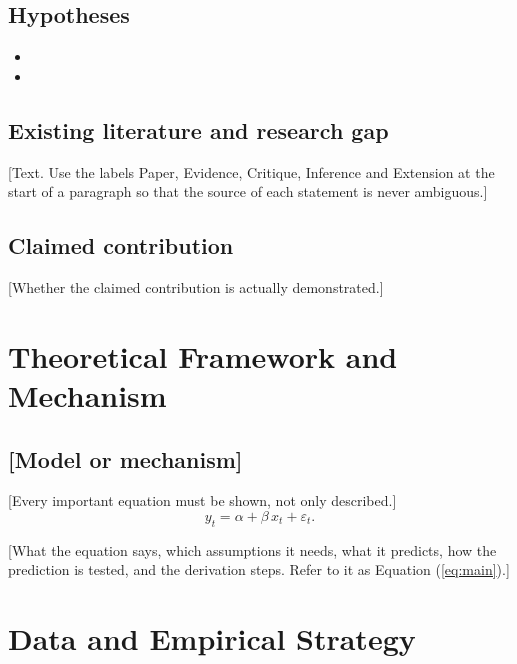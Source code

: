 \documentclass{lrreview}
\begin{document}
\subsection{Hypotheses}
\begin{itemize}
  \item{}
  \item{}
\end{itemize}

\subsection{Existing literature and research gap}
[Text. Use the labels Paper, Evidence, Critique, Inference and Extension at the
start of a paragraph so that the source of each statement is never ambiguous.]

\subsection{Claimed contribution}
 [Whether the claimed contribution is actually demonstrated.]

\section{Theoretical Framework and Mechanism}

\subsection{[Model or mechanism]}
 [Every important equation must be shown, not only described.]
\begin{equation}
  y_t = \alpha + \beta\, x_t + \varepsilon_t .
  \label{eq:main}
\end{equation}
\begin{lrdefs}
\end{lrdefs}
[What the equation says, which assumptions it needs, what it predicts, how the
prediction is tested, and the derivation steps. Refer to it as Equation
(\ref{eq:main}).]

\section{Data and Empirical Strategy}
\end{document}
